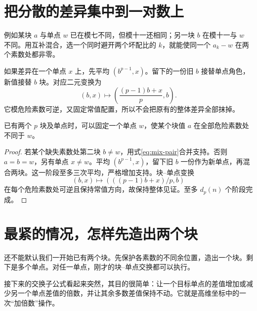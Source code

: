 \section{把分散的差异集中到一对数上}
例如某块 $a$ 与单点 $w$ 已在模七不同，但模十一还相同；另一块 $b$ 在模十一与 $w$ 不同。用互补混合，选一个同时避开两个坏配比的 $k$，就能使同一个 $a_k-w$ 在两个素数处都非零。

如果差异在一个单点 $x$ 上，先平均 $(b^{p-1},x)$。留下的一份旧 $b$ 接替单点角色，新值接替 $b$ 块。对应二元变换为
\[(b,x)\mapsto\left(\frac{(p-1)b+x}{p},b\right).
\]
它模危险素数可逆，又固定常值配置，所以不会把原有的整体差异全部抹掉。
\begin{lemma}[把同余见证集中到一个差分]\label{lem:concentrate}
已有两个 $p$ 块及单点时，可以固定一个单点 $w$，使某个块值 $a$ 在全部危险素数处不同于 $w$。
\end{lemma}
\begin{proof}
若某个缺失素数处第二块 $b\ne w$，用式\eqref{eq:mix-pair}合并支持。否则 $a=b=w$，另有单点 $x\ne w$。平均 $(b^{p-1},x)$，留下旧 $b$ 一份作为新单点，再混合两块。这一阶段至多三次平均，严格增加支持。块--单点变换
\begin{equation}\label{eq:exchange}
(b,x)\longmapsto(((p-1)b+x)/p,b)
\end{equation}
在每个危险素数处可逆且保持常值方向，故保持整体见证。至多 $d_p(n)$ 个阶段完成。
\end{proof}

\section{最紧的情况，怎样先造出两个块}
还不能默认我们一开始已有两个块。先保护各素数的不同余位置，造出一个块。剩下是多个单点。对任一单点，刚才的块--单点交换都可以执行。

接下来的交换子公式看起来突然，其目的很简单：让一个目标单点的差值增加或减少另一个单点差值的倍数，并让其余多数差值保持不动。它就是高维坐标中的一次“加倍数”操作。

